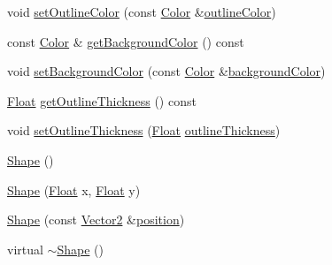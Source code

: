 \begin{DoxyCompactItemize}
\item 
void \hyperlink{classZeta_1_1Shape_a7c76b1c1451a9132e5febdca51f5f332}{set\+Outline\+Color} (const \hyperlink{classZeta_1_1Color}{Color} \&\hyperlink{classZeta_1_1Shape_aaa2b28f381c0230656757fc2fbdb3101}{outline\+Color})
\item 
const \hyperlink{classZeta_1_1Color}{Color} \& \hyperlink{classZeta_1_1Shape_a93e4ef2a66784b7a2c24a8ee1f62e570}{get\+Background\+Color} () const 
\item 
void \hyperlink{classZeta_1_1Shape_a3b60c6845357d7a5728e9a7cc8e2d345}{set\+Background\+Color} (const \hyperlink{classZeta_1_1Color}{Color} \&\hyperlink{classZeta_1_1Shape_a39c21aac4bc876b13d1d208223ee5d13}{background\+Color})
\item 
\hyperlink{namespaceZeta_a1e0a1265f9b3bd3075fb0fabd39088ba}{Float} \hyperlink{classZeta_1_1Shape_a837f9d7c8c48a19a05ee6224ce5a7c58}{get\+Outline\+Thickness} () const 
\item 
void \hyperlink{classZeta_1_1Shape_a3aa19df841ee929ab99e12da722f5db2}{set\+Outline\+Thickness} (\hyperlink{namespaceZeta_a1e0a1265f9b3bd3075fb0fabd39088ba}{Float} \hyperlink{classZeta_1_1Shape_ad7939b5b43a612405ef8807b0202fd64}{outline\+Thickness})
\item 
\hyperlink{classZeta_1_1Shape_a39c13e9ecee8d16f0bb19ddc2951de68}{Shape} ()
\item 
\hyperlink{classZeta_1_1Shape_ab850ff85f217961069d8079d86ba55cd}{Shape} (\hyperlink{namespaceZeta_a1e0a1265f9b3bd3075fb0fabd39088ba}{Float} x, \hyperlink{namespaceZeta_a1e0a1265f9b3bd3075fb0fabd39088ba}{Float} y)
\item 
\hyperlink{classZeta_1_1Shape_a0204f3274e945419dcabdd95abb8020c}{Shape} (const \hyperlink{classZeta_1_1Vector2}{Vector2} \&\hyperlink{classZeta_1_1Shape_ab60c908376dd309194138fe775230e4b}{position})
\item 
virtual \hyperlink{classZeta_1_1Shape_a19920fa7a95ecc3d38057724f7696d5d}{$\sim$\+Shape} ()
\end{DoxyCompactItemize}
